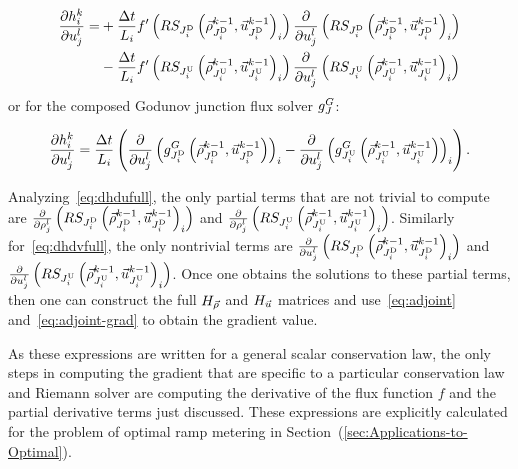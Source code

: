 				\begin{align}
					\frac{\partial h_{i}^{k}}{\partial u_{j}^{l}}= & +\frac{\Delta t}{L_{i}}f'\left(RS_{J_{i}^{\text{D}}}\left(\vec{\rho}_{J_{i}^{\text{D}}}^{k-1},\vec{u}_{J_{i}^{\text{D}}}^{k-1}\right)_{i}\right)\frac{\partial}{\partial u_{j}^{l}}\left(RS_{J_{i}^{\text{D}}}\left(\vec{\rho}_{J_{i}^{\text{D}}}^{k-1},\vec{u}_{J_{i}^{\text{D}}}^{k-1}\right)_{i}\right)\label{eq:dhdvfull} \\
					                                                 & -\frac{\Delta t}{L_{i}}f'\left(RS_{J_{i}^{\text{U}}}\left(\vec{\rho}_{J_{i}^{\text{U}}}^{k-1},\vec{u}_{J_{i}^{\text{U}}}^{k-1}\right)_{i}\right)\frac{\partial}{\partial u_{j}^{l}}\left(RS_{J_{i}^{\text{U}}}\left(\vec{\rho}_{J_{i}^{\text{U}}}^{k-1},\vec{u}_{J_{i}^{\text{U}}}^{k-1}\right)_{i}\right)\nonumber                       
				\end{align}
or for the composed Godunov junction flux solver $g^{G}_{J}$:
								
				\begin{equation}
					\frac{\partial h_{i}^{k}}{\partial u_{j}^{l}}=\frac{\Delta t}{L_{i}}\left(\frac{\partial}{\partial u_{j}^{l}}\left(g^{G}_{J_{i}^{\text{D}}}\left(\vec{\rho}_{J_{i}^{\text{D}}}^{k-1},\vec{u}_{J_{i}^{\text{D}}}^{k-1}\right)\right)_{i}-\frac{\partial}{\partial u_{j}^{l}}\left(g^{G}_{J_{i}^{\text{U}}}\left(\vec{\rho}_{J_{i}^{\text{U}}}^{k-1},\vec{u}_{J_{i}^{\text{U}}}^{k-1}\right)\right)_{i}\right)\label{eqdhdvgod}.
				\end{equation}
								
								
				Analyzing~\eqref{eq:dhdufull}, the only partial terms that are not
				trivial to compute are $\frac{\partial}{\partial\rho_{j}^{l}}\left(RS_{J_{i}^{\text{D}}}\left(\vec{\rho}_{J_{i}^{\text{D}}}^{k-1},\vec{u}_{J_{i}^{\text{D}}}^{k-1}\right)_{i}\right)$
				and $\frac{\partial}{\partial\rho_{j}^{l}}\left(RS_{J_{i}^{\text{U}}}\left(\vec{\rho}_{J_{i}^{\text{U}}}^{k-1},\vec{u}_{J_{i}^{\text{U}}}^{k-1}\right)_{i}\right)$.
				Similarly for~\eqref{eq:dhdvfull}, the only nontrivial terms are
				$\frac{\partial}{\partial u_{j}^{l}}\left(RS_{J_{i}^{\text{D}}}\left(\vec{\rho}_{J_{i}^{\text{D}}}^{k-1},\vec{u}_{J_{i}^{\text{D}}}^{k-1}\right)_{i}\right)$
				and $\frac{\partial}{\partial u_{j}^{l}}\left(RS_{J_{i}^{\text{U}}}\left(\vec{\rho}_{J_{i}^{\text{U}}}^{k-1},\vec{u}_{J_{i}^{\text{U}}}^{k-1}\right)_{i}\right)$.
				Once one obtains the solutions to these partial terms, then one can
				construct the full $H_{\vec{\rho}}$ and $H_{\vec{u}}$ matrices and use~\eqref{eq:adjoint}
				and~\eqref{eq:adjoint-grad} to obtain the gradient value.
								
				As these expressions are written for a general scalar conservation
				law, the only steps in computing the gradient that are specific to
				a particular conservation law and Riemann solver are computing the
				derivative of the flux function $f$ and the partial derivative terms
				just discussed. These expressions are explicitly calculated for the
				problem of optimal ramp metering in Section~(\ref{sec:Applications-to-Optimal}).
								
